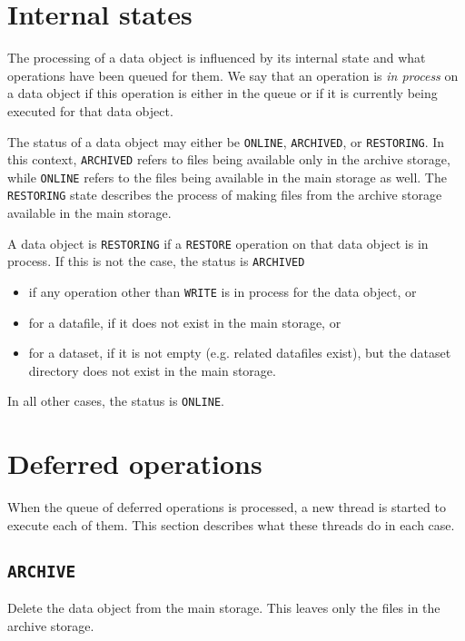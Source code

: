 \documentclass[paper=a4]{scrartcl}
\begin{document}
\section{Internal states}
\label{sec:states}

The processing of a data object is influenced by its internal state
and what operations have been queued for them.  We say that an
operation is \emph{in process} on a data object if this operation is
either in the queue or if it is currently being executed for that
data object.

The status of a data object may either be \texttt{ONLINE},
\texttt{ARCHIVED}, or \texttt{RESTORING}.  In this context,
\texttt{ARCHIVED} refers to files being available only in the archive
storage, while \texttt{ONLINE} refers to the files being available in
the main storage as well.  The \texttt{RESTORING} state describes the
process of making files from the archive storage available in the
main storage.

A data object is \texttt{RESTORING} if a \texttt{RESTORE}
operation on that data object is in process.  If this is not the case,
the status is \texttt{ARCHIVED}
\begin{itemize}[noitemsep,topsep=0pt]
\item if any operation other than \texttt{WRITE} is in process
for the data object, or
\item for a datafile, if it does not exist in the main storage, or
\item for a dataset, if it is not empty (e.g. related datafiles
exist), but the dataset directory does not exist in the main storage.
\end{itemize}
In all other cases, the status is \texttt{ONLINE}.


\section{Deferred operations}
\label{sec:defops}

When the queue of deferred operations is processed, a new thread is
started to execute each of them.  This section describes what these
threads do in each case.

\subsection{\texttt{ARCHIVE}}
\label{sec:defops:archive}

Delete the data object from the main storage.  This leaves only the
files in the archive storage.
\end{document}
